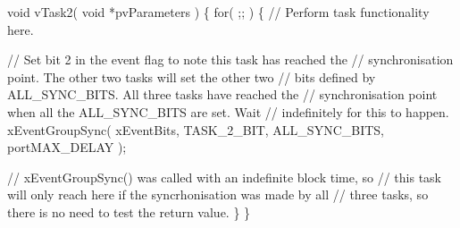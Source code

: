 \begin{DoxyPre}void vTask2( void *pvParameters )
\{
    for( ;; )
    \{
    // Perform task functionality here.\end{DoxyPre}



\begin{DoxyPre}    // Set bit 2 in the event flag to note this task has reached the
    // synchronisation point.  The other two tasks will set the other two
    // bits defined by ALL\_SYNC\_BITS.  All three tasks have reached the
    // synchronisation point when all the ALL\_SYNC\_BITS are set.  Wait
    // indefinitely for this to happen.
    xEventGroupSync( xEventBits, TASK\_2\_BIT, ALL\_SYNC\_BITS, portMAX\_DELAY );\end{DoxyPre}



\begin{DoxyPre}    // xEventGroupSync() was called with an indefinite block time, so
    // this task will only reach here if the syncrhonisation was made by all
    // three tasks, so there is no need to test the return value.
   \}
\}\end{DoxyPre}



\begin{DoxyPre}\end{DoxyPre}
 